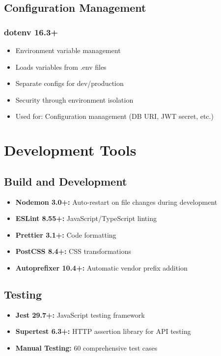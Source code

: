 \documentclass[12pt,a4paper]{report}
\begin{document}
\subsection{Configuration Management}

\subsubsection{dotenv 16.3+}
\begin{itemize}[leftmargin=*]
    \item Environment variable management
    \item Loads variables from .env files
    \item Separate configs for dev/production
    \item Security through environment isolation
    \item Used for: Configuration management (DB URI, JWT secret, etc.)
\end{itemize}

\section{Development Tools}

\subsection{Build and Development}

\begin{itemize}[leftmargin=*]
    \item \textbf{Nodemon 3.0+:} Auto-restart on file changes during development
    \item \textbf{ESLint 8.55+:} JavaScript/TypeScript linting
    \item \textbf{Prettier 3.1+:} Code formatting
    \item \textbf{PostCSS 8.4+:} CSS transformations
    \item \textbf{Autoprefixer 10.4+:} Automatic vendor prefix addition
\end{itemize}

\subsection{Testing}

\begin{itemize}[leftmargin=*]
    \item \textbf{Jest 29.7+:} JavaScript testing framework
    \item \textbf{Supertest 6.3+:} HTTP assertion library for API testing
    \item \textbf{Manual Testing:} 60 comprehensive test cases
\end{itemize}
\end{document}
